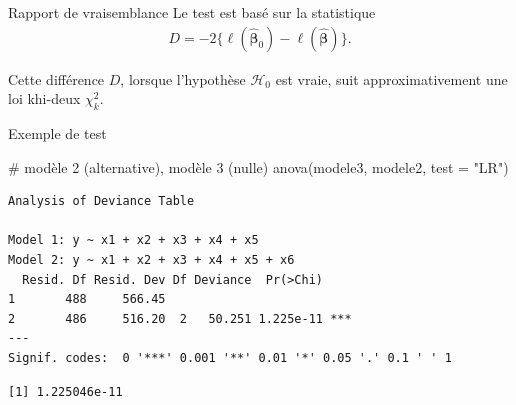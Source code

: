\documentclass[
  ignorenonframetext,
]{beamer}
\newenvironment{Shaded}{\begin{snugshade}}{\end{snugshade}}
\newcommand{\AttributeTok}[1]{\textcolor[rgb]{0.40,0.45,0.13}{#1}}
\newcommand{\CommentTok}[1]{\textcolor[rgb]{0.37,0.37,0.37}{#1}}
\newcommand{\ConstantTok}[1]{\textcolor[rgb]{0.56,0.35,0.01}{#1}}
\newcommand{\DecValTok}[1]{\textcolor[rgb]{0.68,0.00,0.00}{#1}}
\newcommand{\DocumentationTok}[1]{\textcolor[rgb]{0.37,0.37,0.37}{\textit{#1}}}
\newcommand{\FunctionTok}[1]{\textcolor[rgb]{0.28,0.35,0.67}{#1}}
\newcommand{\NormalTok}[1]{\textcolor[rgb]{0.00,0.23,0.31}{#1}}
\newcommand{\OtherTok}[1]{\textcolor[rgb]{0.00,0.23,0.31}{#1}}
\newcommand{\SpecialCharTok}[1]{\textcolor[rgb]{0.37,0.37,0.37}{#1}}
\newcommand{\StringTok}[1]{\textcolor[rgb]{0.13,0.47,0.30}{#1}}
\begin{document}
\begin{frame}{Rapport de vraisemblance}
\protect\hypertarget{rapport-de-vraisemblance}{}
Le test est basé sur la statistique \begin{align*}
 D = -2\{\ell(\widehat{\boldsymbol{\beta}}_0)-\ell(\widehat{\boldsymbol{\beta}})\}.
\end{align*}

Cette différence \(D\), lorsque l'hypothèse \(\mathscr{H}_0\) est vraie,
suit approximativement une loi khi-deux \(\chi^2_k\).
\end{frame}

\begin{frame}[fragile]{Exemple de test}
\protect\hypertarget{exemple-de-test}{}
\footnotesize

\begin{Shaded}
\begin{Highlighting}[numbers=left,,]
\CommentTok{\# modèle 2 (alternative), modèle 3 (nulle)}
\FunctionTok{anova}\NormalTok{(modele3, modele2, }\AttributeTok{test =} \StringTok{"LR"}\NormalTok{)}
\end{Highlighting}
\end{Shaded}

\begin{verbatim}
Analysis of Deviance Table

Model 1: y ~ x1 + x2 + x3 + x4 + x5
Model 2: y ~ x1 + x2 + x3 + x4 + x5 + x6
  Resid. Df Resid. Dev Df Deviance  Pr(>Chi)    
1       488     566.45                          
2       486     516.20  2   50.251 1.225e-11 ***
---
Signif. codes:  0 '***' 0.001 '**' 0.01 '*' 0.05 '.' 0.1 ' ' 1
\end{verbatim}

\begin{Shaded}
\end{Shaded}

\begin{verbatim}
[1] 1.225046e-11
\end{verbatim}

\normalsize
\end{frame}
\end{document}
